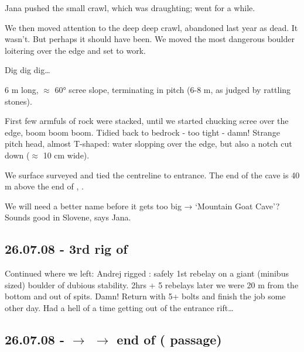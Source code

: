 Jana pushed the small crawl, which was draughting; went for a while.

We then moved attention to the deep deep crawl, abandoned last year as
dead. It wasn't. But perhaps it should have been. We moved the most
dangerous boulder loitering over the edge and set to work.

Dig dig dig\ldots{}

6 m long, $\approx$ 60° scree slope, terminating in pitch (6-8 m,
as judged by rattling stones).

First few armfuls of rock were stacked, until we started chucking scree
over the edge, boom boom boom. Tidied back to bedrock - too tight -
damn! Strange pitch head, almost T-shaped: water slopping over the edge,
but also a notch cut down ($\approx$ 10 cm wide).

We surface surveyed and tied the centreline to  entrance.
The end of the cave is 40 m above the end of , .

We will need a better name before it gets too big → `Mountain Goat
Cave'? Sounds good in Slovene, says Jana.



\subsection{26.07.08 - 3rd rig of \protect{}}


Continued where we left: Andrej rigged : safely 1st rebelay on
a giant (minibus sized) boulder of dubious stability. 2hrs + 5 rebelays
later we were 20 m from the bottom and out of spits. Damn! Return with 5+
bolts and finish the job some other day. Had a hell of a time getting
out of the entrance rift\ldots{}










\subsection{26.07.08 -  $\rightarrow$  $\rightarrow$ end of  ( passage)}

